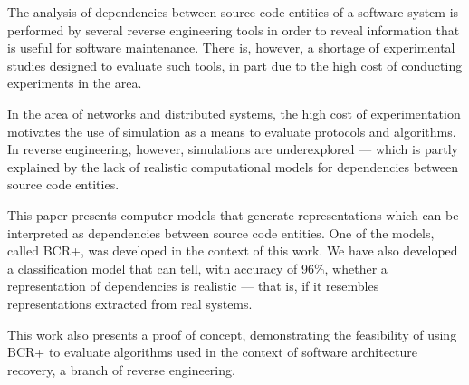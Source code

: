 
The analysis of dependencies between source code entities of a software system is performed by several reverse engineering tools in order to reveal information that is useful for software maintenance. There is, however, a shortage of experimental studies designed to evaluate such tools, in part due to the high cost of conducting experiments in the area.

In the area of networks and distributed systems, the high cost of experimentation motivates the use of simulation as a means to evaluate protocols and algorithms. In reverse engineering, however, simulations are underexplored --- which is partly explained by the lack of realistic computational models for dependencies between source code entities.

This paper presents computer models that generate representations which can be interpreted as dependencies between source code entities. One of the models, called BCR+, was developed in the context of this work. We have also developed a classification model that can tell, with accuracy of 96\%, whether a representation of dependencies is realistic --- that is, if it resembles representations extracted from real systems. %


This work also presents a proof of concept, demonstrating the feasibility of using BCR+ to evaluate algorithms used in the context of software architecture recovery, a branch of reverse engineering.
